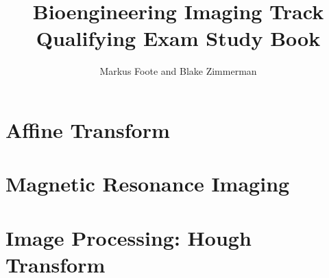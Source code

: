 \documentclass{report}
\title{Bioengineering Imaging Track Qualifying Exam Study Book}
\author{Markus Foote and Blake Zimmerman}
\begin{document}
	\maketitle
	\tableofcontents
	
	\chapter{Affine Transform}
	
	
	\chapter{Magnetic Resonance Imaging}
	
	
	\chapter{Image Processing: Hough Transform}
	
	
\end{document}
